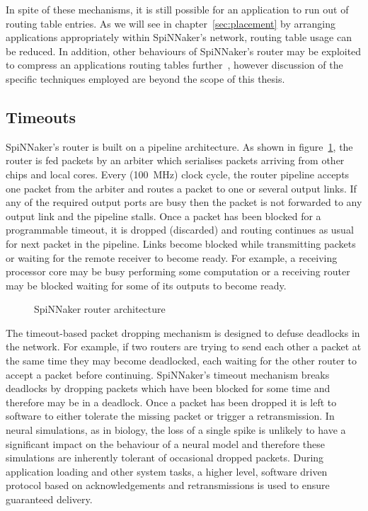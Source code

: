 			In spite of these mechanisms, it is still possible for an application to
			run out of routing table entries. As we will see in
			chapter~\ref{sec:placement} by arranging applications appropriately
			within SpiNNaker's network, routing table usage can be reduced. In
			addition, other behaviours of SpiNNaker's router may be exploited to
			compress an applications routing tables further~\cite{mundy16}, however
			discussion of the specific techniques employed are beyond the scope of
			this thesis.
		
		\subsection{Timeouts}
			
			SpiNNaker's router is built on a pipeline architecture. As shown in
			figure~\ref{fig:router-architecture}, the router is fed packets by an
			arbiter which serialises packets arriving from other chips and local
			cores. Every (\SI{100}{\mega\hertz}) clock cycle, the router pipeline
			accepts one packet from the arbiter and routes a packet to one or several
			output links. If any of the required output ports are busy then the
			packet is not forwarded to any output link and the pipeline stalls. Once
			a packet has been blocked for a programmable timeout, it is dropped
			(discarded) and routing continues as usual for next packet in the
			pipeline. Links become blocked while transmitting packets or waiting for
			the remote receiver to become ready. For example, a receiving processor
			core may be busy performing some computation or a receiving router may be
			blocked waiting for some of its outputs to become ready.
			
			\begin{figure}
				\center
				
				\caption{SpiNNaker router architecture}
				\label{fig:router-architecture}
			\end{figure}
			
			The timeout-based packet dropping mechanism is designed to defuse
			deadlocks in the network. For example, if two routers are trying to send
			each other a packet at the same time they may become deadlocked, each
			waiting for the other router to accept a packet before continuing.
			SpiNNaker's timeout mechanism breaks deadlocks by dropping packets which
			have been blocked for some time and therefore may be in a deadlock.  Once
			a packet has been dropped it is left to software to either tolerate the
			missing packet or trigger a retransmission. In neural simulations, as in
			biology, the loss of a single spike is unlikely to have a significant
			impact on the behaviour of a neural model and therefore these simulations
			are inherently tolerant of occasional dropped packets. During application
			loading and other system tasks, a higher level, software driven protocol
			based on acknowledgements and retransmissions is used to ensure
			guaranteed delivery.
			
